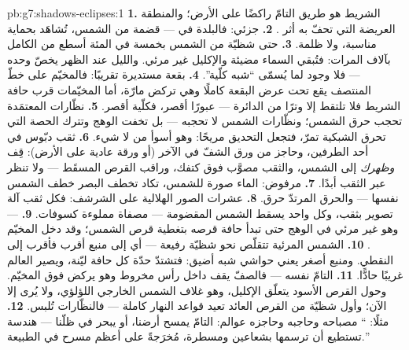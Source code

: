 \begin{solution}{pb:g7:shadows-eclipses:1}
\textbf{1.} الشريط هو طريق   التامّ راكضًا على الأرض؛
والمنطقة العريضة التي تحفّ به أثر .
\textbf{2.}  جزئي: فالبلدة في  --- قضمة من الشمس،
تُشاهَد بحماية مناسبة، ولا ظلمة.
\textbf{3.} حتى شظيّة من الشمس بخمسة في المئة أسطع من 
 الكامل بآلاف المرات: فتُبقي السماء مضيئة والإكليل غير
مرئي. والليل عند الظهر يخصّ  وحده --- فلا وجود لما
يُسمّى ``شبه كلّية''.
\textbf{4.} بقعة  مستديرة تقريبًا: فالمخيّم على
خطّ المنتصف يقع تحت عرض البقعة كاملًا وهي تركض مارّة، أما
المخيّمات قرب حافة الشريط فلا تلتقط إلا وترًا من الدائرة ---
عبورًا أقصر، فكلّية أقصر.
\textbf{5.} نظّارات  المعتمَدة تحجب حرق الشمس؛ ونظّارات
الشمس لا تحجبه --- بل تخفت الوهج وتترك الحصة التي تحرق
الشبكية تمرّ، فتجعل التحديق مريحًا: وهو أسوأ من لا شيء.
\textbf{6.} ثقب دبّوس في أحد الطرفين، وحاجز من ورق الشفّ في
الآخر (أو ورقة عادية على الأرض): قِف \emph{وظهرك} إلى الشمس،
والثقب مصوَّب فوق كتفك، وراقب القرص المسقَط --- ولا تنظر عبر
الثقب أبدًا.
\textbf{7.} مرفوض:  الماء صورة  للشمس، تكاد تخطف
البصر خطف الشمس نفسها --- والحرق المرتدّ حرق.
\textbf{8.} عشرات الصور الهلالية على الشرشف: فكل ثقب آلة تصوير
بثقب، وكل واحد يسقط الشمس المقضومة --- مصفاة مملوءة كسوفات.
\textbf{9.}  --- وهو غير مرئي في الوهج حتى تبدأ حافة قرصه
بتغطية قرص الشمس؛ وقد دخل المخيّم .
\textbf{10.} الشمس المرئية تتقلّص نحو شظيّة رفيعة --- أي إلى
منبع أقرب فأقرب إلى النقطي. ومنبع أصغر يعني حواشي شبه 
أضيق: فتشتدّ حدّة كل حافة ليّنة، ويصير العالم غريبًا حادًّا.
\textbf{11.}   التامّ نفسه --- فالصفّ يقف داخل رأس
مخروط  وهو يركض فوق المخيّم. وحول القرص الأسود يتعلّق
الإكليل، وهو غلاف الشمس الخارجي اللؤلؤي، ولا يُرى إلا الآن؛
وأول شظيّة من القرص العائد تعيد قواعد  النهار كاملة ---
فالنظّارات تُلبس.
\textbf{12.} مثلًا: ``  مصباحه وحاجبه وحاجزه عوالم:
  التامّ يمسح أرضنا، أو  يبحر في ظلّنا ---
هندسة تستطيع أن ترسمها بشعاعين ومسطرة، مُخرَجةً على أعظم
مسرح في الطبيعة.''
\end{solution}
